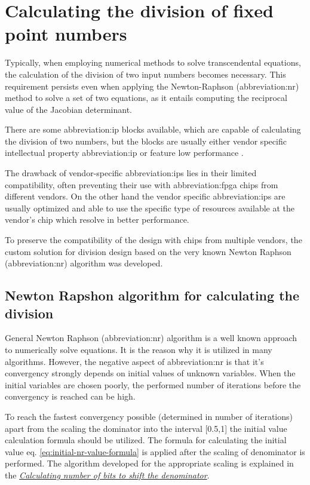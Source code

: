 \documentclass[a4paper, twoside, 11pt]{article}
\begin{document}
\section{Calculating the division of fixed point numbers}\label{sec:calculating-the-division-of-fixed-point-numbers}
Typically, when employing numerical methods to solve transcendental equations, the calculation of the division of two input numbers becomes necessary. This requirement persists even when applying the Newton-Raphson (\gls{abbreviation:nr}) method to solve a set of two equations, as it entails computing the reciprocal value of the Jacobian determinant.\par
There are some \gls{abbreviation:ip} blocks available, which are capable of calculating the division of two numbers, but the blocks are usually either vendor specific intellectual property \gls{abbreviation:ip} \cite{amd-xilinx-vivado-divider-ip-block} or feature low performance \cite{burke-fixed-point-math-library}.\par
The drawback of vendor-specific \gls{abbreviation:ip}s lies in their limited compatibility, often preventing their use with \gls{abbreviation:fpga} chips from different vendors. On the other hand the vendor specific \gls{abbreviation:ip}s are usually optimized and able to use the specific type of resources available at the vendor's chip which resolve in better performance.\par
To preserve the compatibility of the design with chips from multiple vendors, the custom solution for division design based on the very known Newton Raphson (\gls{abbreviation:nr}) algorithm was developed. \cite{burke-fixed-point-math-library}

\subsection{Newton Rapshon algorithm for calculating the division}\label{subsection:newton-raphson-algorithm-for-calculating-the-division}
General Newton Raphson (\gls{abbreviation:nr}) algorithm is a well known approach to numerically solve equations. It is the reason why it is utilized in many algorithms. However, the negative aspect of \gls{abbreviation:nr} is that it's convergency strongly depends on initial values of unknown variables. When the initial variables are chosen poorly, the performed number of iterations before the convergency is reached can be high.\par
To reach the fastest convergency possible (determined in number of iterations) apart from the scaling the dominator into the interval [0.5,1] the initial value calculation formula should be utilized. \cite{burke-fixed-point-math-library}
The formula for calculating the initial value eq. \ref{eq:initial-nr-value-formula} is applied after the scaling of denominator is performed. The algorithm developed for the appropriate scaling is explained in the \hyperref[subsec:calculating-number-of-bits-to-shift-the-denominator]{\textit{Calculating number of bits to shift the denominator}}.
\end{document}
